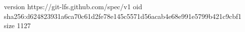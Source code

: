 version https://git-lfs.github.com/spec/v1
oid sha256:d624823931a6ca70c61d2fe78e145c5571d56acab4e68e991e5799b421c9cbf1
size 1127
